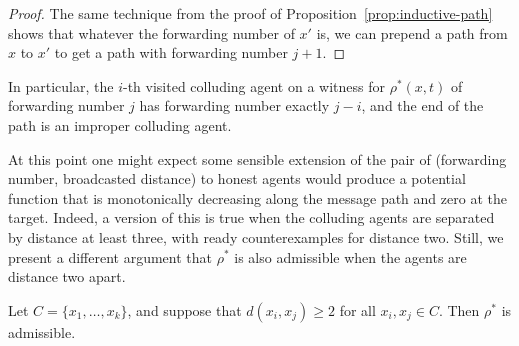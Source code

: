\documentclass[prodmode,acmec]{ec-acmsmall}
\begin{document}
\begin{proof}

The same technique from the proof of Proposition~\ref{prop:inductive-path}
shows that whatever the forwarding number of $x'$ is, we can prepend a path from
$x$ to $x'$ to get a path with forwarding number $j+1$.
\end{proof}

In particular, the $i$-th visited colluding agent on a witness for
$\rho^*(x,t)$ of forwarding number $j$ has forwarding number exactly $j - i$,
and the end of the path is an improper colluding agent.

At this point one might expect some sensible extension of the pair of
(forwarding number, broadcasted distance) to honest agents would produce a
potential function that is monotonically decreasing along the message path and
zero at the target. Indeed, a version of this is true when the colluding agents
are separated by distance at least three, with ready counterexamples for
distance two. Still, we present a different argument that $\rho^*$ is also
admissible when the agents are distance two apart.
 
\begin{proposition} \label{prop:rhostar-admissible}

Let $C = \{ x_1, \dots, x_k \}$, and suppose that $d(x_i, x_j) \geq 2$ for all
$x_i, x_j \in C$. Then $\rho^*$ is admissible.

\end{proposition}
\end{document}
